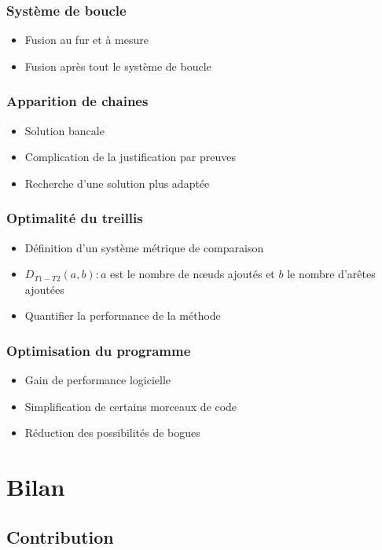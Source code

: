 \documentclass{beamer}
\begin{document}
\begin{frame}
	\frametitle{Système de boucle}
	\begin{itemize}
		\item Fusion au fur et à mesure
		\item Fusion après tout le système de boucle
	\end{itemize}
\end{frame}

\begin{frame}
	\frametitle{Apparition de chaines}
	\begin{itemize}
		\item Solution bancale
		\item Complication de la justification par preuves
		\item Recherche d'une solution plus adaptée
	\end{itemize}
\end{frame}

\begin{frame}
	\frametitle{Optimalité du treillis}
	\begin{itemize}
		\item Définition d'un système métrique de comparaison
		\item $D_{T1-T2}(a, b) : a$ est le nombre de n\oe uds ajoutés et $b$ le nombre d'arêtes ajoutées
		\item Quantifier la performance de la méthode
	\end{itemize}
\end{frame}

\begin{frame}
	\frametitle{Optimisation du programme}
	\begin{itemize}
		\item Gain de performance logicielle
		\item Simplification de certains morceaux de code
		\item Réduction des possibilités de bogues
	\end{itemize}
\end{frame}

\section{Bilan}

\subsection{Contribution}
\end{document}
